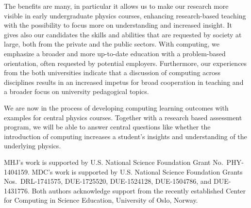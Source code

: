 \documentclass[graybox,envcountchap,sectrefs]{svmult}
\begin{document}
The benefits are many, in particular it allows us to make our research
more visible in early undergraduate physics courses, enhancing
research-based teaching with the possibility to focus more on
understanding and increased insight.  It gives also our candidates the
skills and abilities that are requested by society at large, both from
the private and the public sectors. With computing, we emphasize a broader and
more up-to-date education with a problem-based orientation, often
requested by potential employers.  Furthermore, our experiences from the both universities
indicate that a discussion of computing across disciplines results in an increased
impetus for broad cooperation in teaching and a broader focus on university pedagogical topics.

We are now in the process of developing computing learning outcomes with
examples for central physics courses. Together with a research based assessment program, we will be able to answer central questions like whether the introduction of computing increases a student's insights and understanding of the underlying physics.



\begin{acknowledgement}
MHJ's work is supported by U.S. National Science Foundation Grant No.~PHY-1404159.
MDC's work is supported by U.S. National Science Foundation Grants Nos.~DRL-1741575, DUE-1725520, DUE-1524128, DUE-1504786, and DUE-1431776.
Both authors acknowledge support from the recently established Center for Computing in Science Education, University of Oslo, Norway.
\end{acknowledgement}
\end{document}
